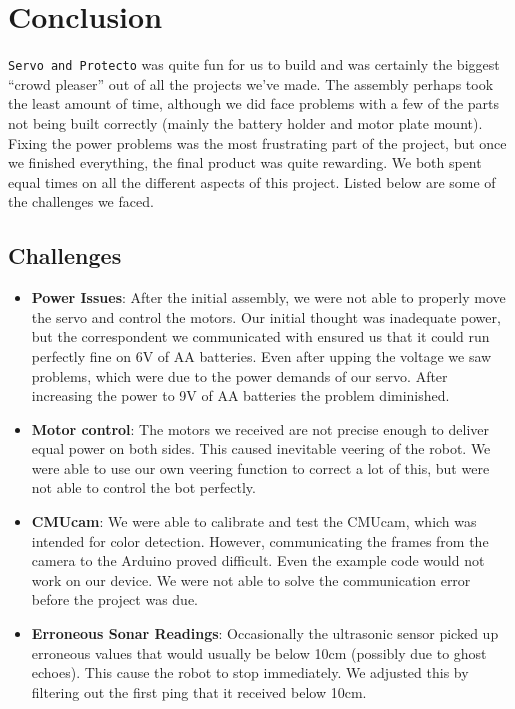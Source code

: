 \documentclass[11pt]{article}
\begin{document}
\section{Conclusion}
\texttt{Servo and Protecto} was quite fun for us to build and was certainly the biggest ``crowd pleaser'' out of all the projects we've made.  The assembly perhaps took the least amount of time, although we did face problems with a few of the parts not being built correctly (mainly the battery holder and motor plate mount).  Fixing the power problems was the most frustrating part of the project, but once we finished everything, the final product was quite rewarding.  We both spent equal times on all the different aspects of this project.  Listed below are some of the challenges we faced.
	
	\subsection{Challenges}
		
		\begin{itemize}				
		\item \textbf{Power Issues}: After the initial assembly, we were not able to properly move the servo and control the motors.  Our initial thought was inadequate power, but the correspondent we communicated with ensured us that it could run perfectly fine on 6V of AA batteries.  Even after upping the voltage we saw problems, which were due to the power demands of our servo.  After increasing the power to 9V of AA batteries the problem diminished.
		\item \textbf{Motor control}: The motors we received are not precise enough to deliver equal power on both sides.  This caused inevitable veering of the robot.  We were able to use our own veering function to correct a lot of this, but were not able to control the bot perfectly.
		\item \textbf{CMUcam}: We were able to calibrate and test the CMUcam, which was intended for color detection.  However, communicating the frames from the camera to the Arduino proved difficult.  Even the example code would not work on our device. We were not able to solve the communication error before the project was due.
		\item \textbf{Erroneous Sonar Readings}: Occasionally the ultrasonic sensor picked up erroneous values that would usually be below 10cm (possibly due to ghost echoes).  This cause the robot to stop immediately.  We adjusted this by filtering out the first ping that it received below 10cm.
		\end{itemize}
\end{document}
